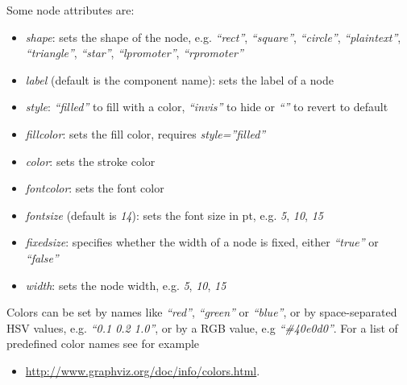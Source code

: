 \documentclass[letterpaper,10pt,english]{sphinxmanual}
\begin{document}
Some node attributes are:
\begin{itemize}
\item {} 
\emph{shape}: sets the shape of the node, e.g. \emph{``rect''}, \emph{``square''}, \emph{``circle''}, \emph{``plaintext''}, \emph{``triangle''}, \emph{``star''}, \emph{``lpromoter''}, \emph{``rpromoter''}

\item {} 
\emph{label} (default is the component name): sets the label of a node

\item {} 
\emph{style}: \emph{``filled''} to fill with a color, \emph{``invis''} to hide or \emph{``''} to revert to default

\item {} 
\emph{fillcolor}: sets the fill color, requires \emph{style=''filled''}

\item {} 
\emph{color}: sets the stroke color

\item {} 
\emph{fontcolor}: sets the font color

\item {} 
\emph{fontsize} (default is \emph{14}): sets the font size in pt, e.g. \emph{5}, \emph{10}, \emph{15}

\item {} 
\emph{fixedsize}: specifies whether the width of a node is fixed, either \emph{``true''} or \emph{``false''}

\item {} 
\emph{width}: sets the node width, e.g. \emph{5}, \emph{10}, \emph{15}

\end{itemize}

Colors can be set by names like \emph{``red''}, \emph{``green''} or \emph{``blue''},
or by space-separated HSV values, e.g. \emph{``0.1 0.2 1.0''},
or by a RGB value, e.g \emph{``\#40e0d0''}.
For a list of predefined color names see for example
\begin{itemize}
\item {} 
\href{http://www.graphviz.org/doc/info/colors.html}{http://www.graphviz.org/doc/info/colors.html}.

\end{itemize}
\end{document}
